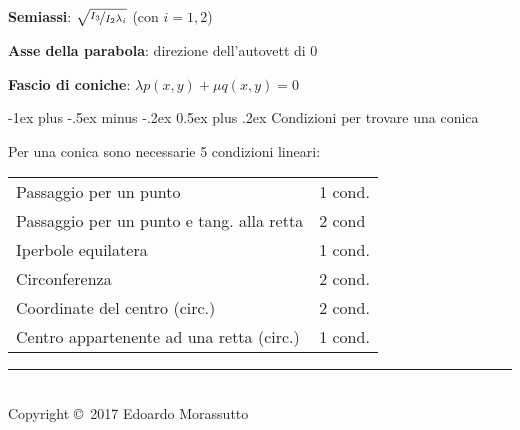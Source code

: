 \documentclass[10pt,landscape]{article}
\makeatletter
\renewcommand{\section}{\@startsection{section}{1}{0mm}%
                                {-1ex plus -.5ex minus -.2ex}%
                                {0.5ex plus .2ex}%
                                {\normalfont\large\bfseries}}
\makeatother
\begin{document}
\begin{multicols}{3}
\textbf{Semiassi}: $\sqrt{\nicefrac{I_3}{I_2\lambda_i}}$ (con $i=1,2$)

\textbf{Asse della parabola}: direzione dell'autovett di 0

\textbf{Fascio di coniche}: $\lambda p(x,y) + \mu q(x,y) = 0$

\section{Condizioni per trovare una conica}

Per una conica sono necessarie 5 condizioni lineari:
\begin{tabular}{ll}
	Passaggio per un punto & 1 cond. \\
	Passaggio per un punto e tang. alla retta & 2 cond \\
	Iperbole equilatera & 1 cond. \\
	Circonferenza & 2 cond. \\
	Coordinate del centro (circ.) & 2 cond. \\
	Centro appartenente ad una retta (circ.) & 1 cond. \\
\end{tabular}


\rule{0.3\linewidth}{0.25pt}
\scriptsize\\
Copyright \copyright\ 2017 Edoardo Morassutto
\end{multicols}
\end{document}
